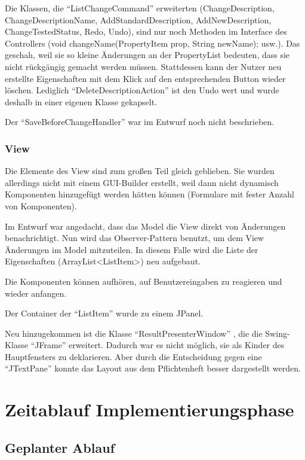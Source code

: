 \documentclass[a4paper]{scrreprt}
\begin{document}
Die Klassen, die "`ListChangeCommand"' erweiterten (ChangeDescription, ChangeDescriptionName, AddStandardDescription, AddNewDescription, ChangeTestedStatus, Redo, Undo), sind nur noch Methoden im Interface des Controllers (void changeName(PropertyItem prop, String newName); usw.). Das geschah, weil sie so kleine Änderungen an der PropertyList bedeuten, dass sie nicht rückgängig gemacht werden müssen. Stattdessen kann der Nutzer neu erstellte Eigenschaften mit dem Klick auf den entsprechenden Button wieder löschen. Lediglich "`DeleteDescriptionAction"' ist den Undo wert und wurde deshalb in einer eigenen Klasse gekapselt.

Der "`SaveBeforeChangeHandler"' war im Entwurf noch nicht beschrieben.

\subsection{View}
Die Elemente des View sind zum großen Teil gleich geblieben. Sie wurden allerdings nicht mit einem GUI-Builder erstellt, weil dann nicht dynamisch Komponenten hinzugefügt werden hätten können (Formulare mit fester Anzahl von Komponenten).

Im Entwurf war angedacht, dass das Model die View direkt von Änderungen benachrichtigt. Nun wird das Observer-Pattern benutzt, um dem View Änderungen im Model mitzuteilen. In diesem Falle wird die Liste der Eigenschaften (ArrayList<ListItem>) neu aufgebaut.

Die Komponenten können aufhören, auf Benutzereingaben zu reagieren und wieder anfangen.

Der Container der "`ListItem"' wurde zu einem JPanel.

Neu hinzugekommen ist die Klasse "`ResultPresenterWindow"' , die die Swing-Klasse "`JFrame"' erweitert. Dadurch war es nicht möglich, sie als Kinder des Hauptfensters zu deklarieren. Aber durch die Entscheidung gegen eine "`JTextPane"' konnte das Layout aus dem Pflichtenheft besser dargestellt werden.




\chapter{Zeitablauf Implementierungsphase}

\section{Geplanter Ablauf}
\end{document}
